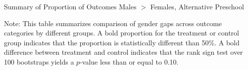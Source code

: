 \begin{table}[H]
\centering
\caption{Summary of Proportion of Outcomes Males $>$ Females, Alternative Preschool}
\label{tab:proportion-table-alt}
\begin{threeparttable}

\begin{tablenotes}
\footnotesize
\item Note: This table summarizes comparison of gender gaps across outcome categories by different groups. A bold proportion for the treatment or control group indicates that the proportion is statistically different than 50\%. A bold difference between treatment and control indicates that the rank sign test over 100 bootstraps yields a $p$-value less than or equal to 0.10. 
\end{tablenotes}
\end{threeparttable}
\end{table}

